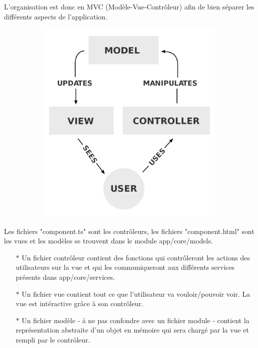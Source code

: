 \documentclass{article}
\begin{document}
L'organisation est donc en MVC (Modèle-Vue-Contrôleur) afin de bien séparer les différents aspects de l'application.
\newline
\begin{figure}[h!]
	\centering
  	\begin{subfigure}[b]{0.45\linewidth}
    \includegraphics[width=\linewidth]{mvc.png}
  	\end{subfigure}
\end{figure}
\newline
Les fichiers "component.ts" sont les contrôleurs, les fichiers "component.html" sont les vues et les modèles se trouvent dans le module app/core/models.
\begin{itemize}
	\item[$\ast$]Un fichier contrôleur contient des fonctions qui contrôleront les actions des utilisateurs sur la vue et qui les communiqueront aux différents services présents dans app/core/services.
	\item[$\ast$]Un fichier vue contient tout ce que l'utilisateur va vouloir/pouvoir voir. La vue est intéractive grâce à son contrôleur.
	\item[$\ast$]Un fichier modèle - à ne pas confondre avec un fichier module - contient la représentation abstraite d'un objet en mémoire qui sera chargé par la vue et rempli par le contrôleur.
\end{itemize}
\end{document}
